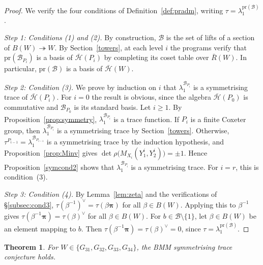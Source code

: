 \documentclass[11pt, reqno]{amsart}
\numberwithin{equation}{section}
\newtheorem{theorem}{Theorem}[section]
\theoremstyle{remark}
\begin{document}
\begin{proof}
	We verify the four conditions of Definition~\ref{def:pradm}, writing
	$\tau=\lambda_1^{\mathrm{pr}(\mathcal B)}$.
	
	\emph{Step 1: Conditions (1) and (2).} By construction, $\mathcal B$ is
	the set of lifts of a section of $B(W)\twoheadrightarrow W$. By
	Section~\ref{towers}, at each level $i$ the programs verify that
	$\mathrm{pr}(\mathcal B_{P_i})$ is a basis of $\bar{\mathcal H}(P_i)$ by
	completing its coset table over $\bar R(W)$. In particular,
	$\mathrm{pr}(\mathcal B)$ is a basis of $\bar{\mathcal H}(W)$.
	
	\emph{Step 2: Condition (3).} We prove by induction on $i$ that
	$\lambda_1^{\mathcal B_{P_i}}$ is a symmetrising trace of
	$\bar{\mathcal H}(P_i)$. For $i=0$ the result is obvious, since the
	algebra $\bar{\mathcal H}(P_0)$ is commutative and $\mathcal B_{P_0}$ is
	its standard basis. Let $i\ge1$. By Proposition~\ref{prop:symmetry},
	$\lambda_1^{\mathcal B_{P_i}}$ is a trace function. If $P_i$ is a finite
	Coxeter group, then $\lambda_1^{\mathcal B_{P_i}}$ is a symmetrising
	trace by Section~\ref{towers}. Otherwise,
	$\tau^{P_{i-1}}=\lambda_1^{\mathcal B_{P_{i-1}}}$ is a symmetrising
	trace by the induction hypothesis, and Proposition~\ref{prop:Minv} gives
	$\det\rho\big(M_{X_i}(Y_1^i,Y_2^i)\big)=\pm1$. Hence
	Proposition~\ref{symcond2} shows that $\lambda_1^{\mathcal B_{P_i}}$ is a
	symmetrising trace. For $i=r$, this is condition~(3).
	
\emph{Step 3: Condition (4).} By Lemma~\ref{lem:zeta} and the
verifications of \S\ref{subsec:cond3}, $\tau(\beta^{-1})^\vee=\tau(\beta\boldsymbol\pi)$ for all
$\beta\in B(W)$. Applying this to $\beta^{-1}$ gives
$\tau(\beta^{-1}\boldsymbol\pi)=\tau(\beta)^\vee$ for all $\beta\in B(W)$. For $b\in\mathcal B\setminus\{1\}$, let $\beta\in B(W)$ be an element mapping to $b$. Then $\tau(\beta^{-1}\boldsymbol\pi)=\tau(\beta)^\vee=0$, since $\tau=\lambda_1^{\mathrm{pr}(\mathcal B)}$.
\end{proof}


\begin{theorem}\label{thm:top}
For $W\in\{G_{31},G_{32},G_{33},G_{34}\}$, the BMM symmetrising trace
conjecture holds.
\end{theorem}
\end{document}
